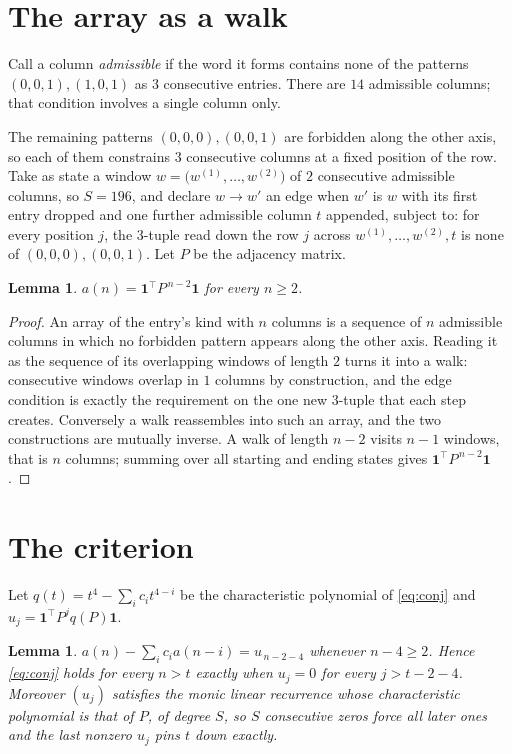 \documentclass[11pt,a4paper]{article}
\theoremstyle{plain}
\newtheorem{lemma}[theorem]{Lemma}
\theoremstyle{definition}
\begin{document}
\section{The array as a walk}

Call a column \emph{admissible} if the word it forms contains none of the patterns
$(0,0,1), (1,0,1)$ as $3$ consecutive entries. There are $14$ admissible columns; that condition
involves a single column only.

The remaining patterns $(0,0,0), (0,0,1)$ are forbidden along the other axis, so each of them
constrains $3$ consecutive columns at a fixed position of the row. Take as state a
window $w=\bigl(w^{(1)},\dots,w^{(2)}\bigr)$ of $2$ consecutive admissible
columns, so $S=196$, and declare $w\to w'$ an edge when $w'$ is $w$ with its first entry
dropped and one further admissible column $t$ appended, subject to: for every position
$j$, the $3$-tuple read down the row $j$ across $w^{(1)},\dots,w^{(2)},t$
is none of $(0,0,0), (0,0,1)$. Let $P$ be the adjacency matrix.

\begin{lemma}\label{lem:walk}
$a(n)=\mathbf{1}^{\!\top}P^{\,n-2}\mathbf{1}$ for every $n\ge2$.
\end{lemma}

\begin{proof}
An array of the entry's kind with $n$ columns is a sequence of $n$ admissible columns in
which no forbidden pattern appears along the other axis. Reading it as the sequence of its
overlapping windows of length $2$ turns it into a walk: consecutive windows overlap in
$1$ columns by construction, and the edge condition is exactly the requirement on the one
new $3$-tuple that each step creates. Conversely a walk reassembles into such an array,
and the two constructions are mutually inverse. A walk of length $n-2$ visits $n-1$
windows, that is $n$ columns; summing over all starting and ending states gives
$\mathbf{1}^{\!\top}P^{\,n-2}\mathbf{1}$.
\end{proof}

\section{The criterion}

Let $q(t)=t^{4}-\sum_i c_i t^{4-i}$ be the characteristic polynomial of
\eqref{eq:conj} and $u_j=\mathbf{1}^{\!\top}P^{j}q(P)\mathbf{1}$.

\begin{lemma}\label{lem:crit}
$a(n)-\sum_i c_i a(n-i)=u_{\,n-2-4}$ whenever $n-4\ge2$. Hence
\eqref{eq:conj} holds for every $n>t$ exactly when $u_j=0$ for every
$j>t-2-4$. Moreover $(u_j)$ satisfies the monic linear recurrence whose
characteristic polynomial is that of $P$, of degree $S$, so $S$ consecutive zeros force all
later ones and the last nonzero $u_j$ pins $t$ down exactly.
\end{lemma}
\end{document}
